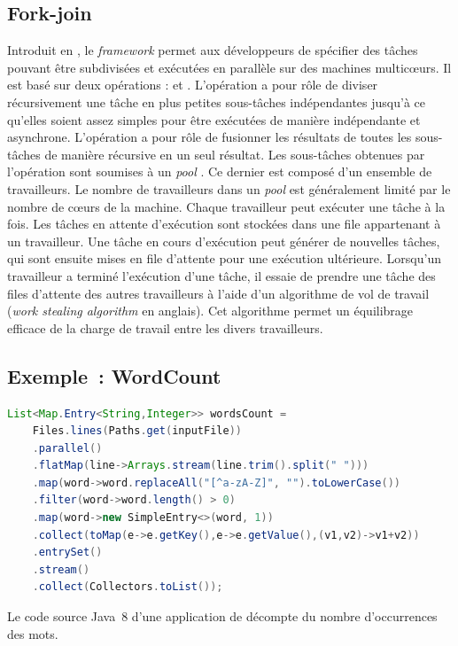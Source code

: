 \subsection{Fork-join}

Introduit en , le \emph{framework}  permet aux d\'eveloppeurs de sp\'ecifier des t\^aches pouvant \^etre subdivis\'ees et ex\'ecut\'ees en parall\`ele sur des machines multicœurs. Il est bas\'e sur deux op\'erations :  et . L'op\'eration  a pour r\^ole de diviser r\'ecursivement une t\^ache en plus petites sous-t\^aches ind\'ependantes jusqu'\`a ce qu'elles soient assez simples pour \^etre ex\'ecut\'ees de mani\`ere ind\'ependante et asynchrone. L'op\'eration  a pour r\^ole de fusionner les r\'esultats de toutes les sous-t\^aches de mani\`ere r\'ecursive en un seul r\'esultat.
Les sous-t\^aches obtenues par l'op\'eration  sont soumises \`a un \emph{pool} . Ce dernier est composé d'un ensemble de travailleurs. Le nombre de travailleurs dans un \emph{pool}  est g\'en\'eralement limit\'e par le nombre de cœurs de la machine. Chaque travailleur peut ex\'ecuter une t\^ache \`a la fois. Les t\^aches en attente d'ex\'ecution sont stock\'ees dans une file appartenant \`a un travailleur. Une t\^ache en cours d'ex\'ecution peut g\'en\'erer de nouvelles t\^aches, qui sont ensuite mises en file d'attente pour une ex\'ecution ult\'erieure. Lorsqu'un travailleur a termin\'e l'ex\'ecution d'une t\^ache, il essaie de prendre une t\^ache des files d'attente des autres travailleurs \`a l'aide d'un algorithme de vol de travail (\emph{work stealing algorithm} en anglais). Cet algorithme permet un \'equilibrage efficace de la charge de travail entre les divers travailleurs.


\subsection{Exemple~: WordCount}


\begin{Listing}[tbp]
\begin{lstlisting}[language=java]
  List<Map.Entry<String,Integer>> wordsCount = 
	Files.lines(Paths.get(inputFile))
    .parallel()
    .flatMap(line->Arrays.stream(line.trim().split(" ")))
    .map(word->word.replaceAll("[^a-zA-Z]", "").toLowerCase())
    .filter(word->word.length() > 0)
    .map(word->new SimpleEntry<>(word, 1))
    .collect(toMap(e->e.getKey(),e->e.getValue(),(v1,v2)->v1+v2))
    .entrySet()
    .stream()
    .collect(Collectors.toList());
\end{lstlisting}
\caption{Le code source Java~8 d'une application de d\'ecompte du nombre d'occurrences des mots.}
\label{wordCountJava}
\end{Listing}


